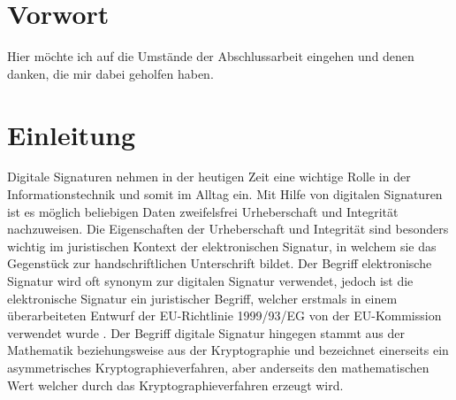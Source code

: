 \documentclass[11pt,a4paper,ngerman]{report}
\begin{document}
\maketitle



\chapter*{Vorwort}
Hier möchte ich auf die Umstände der Abschlussarbeit eingehen und denen danken, die mir dabei geholfen haben.
\clearpage

\tableofcontents
\clearpage


\chapter{Einleitung}
Digitale Signaturen nehmen in der heutigen Zeit eine wichtige Rolle in der Informationstechnik und somit im Alltag ein. Mit Hilfe von digitalen Signaturen ist es möglich beliebigen Daten zweifelsfrei Urheberschaft und Integrität nachzuweisen. Die Eigenschaften der Urheberschaft und Integrität sind besonders wichtig im juristischen Kontext der elektronischen Signatur, in welchem sie das Gegenstück zur handschriftlichen Unterschrift bildet. Der Begriff elektronische Signatur wird oft synonym zur digitalen Signatur verwendet, jedoch ist die elektronische Signatur ein juristischer Begriff, welcher erstmals in einem überarbeiteten Entwurf der EU-Richtlinie 1999/93/EG von der EU-Kommission verwendet wurde \cite{eSigEU99}. Der Begriff digitale Signatur hingegen stammt aus der Mathematik beziehungsweise aus der Kryptographie und bezeichnet einerseits ein asymmetrisches Kryptographieverfahren, aber anderseits den mathematischen Wert welcher durch das Kryptographieverfahren erzeugt wird.
\end{document}
